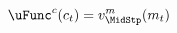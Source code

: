   \begin{equation}\begin{gathered}\begin{aligned}
        \uFunc^{c}(c_{\prd})  & =\vFunc^{m}_{\MidStp}(m_{\prd})\label{eq:upcteqvtp}
      \end{aligned}\end{gathered}\end{equation}
